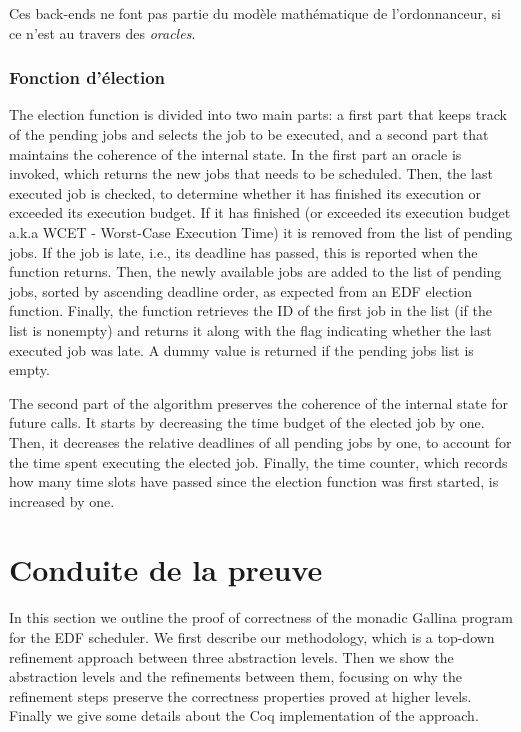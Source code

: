 			Ces back-ends ne font pas partie du modèle mathématique de l'ordonnanceur, si ce n'est au travers des \emph{oracles}.






			\subsubsection{Fonction d'élection}

			The election function is divided into two main parts: a first part that keeps track of the pending jobs and selects the job to be executed, and a second part that maintains the coherence of the internal state. In the first part an oracle is invoked, which returns the new jobs that needs to be scheduled. Then, the last executed job is checked, to determine whether it has finished its execution or exceeded its execution budget. If it has finished (or exceeded its execution budget a.k.a WCET - Worst-Case Execution Time) it is removed from the list of pending jobs. If the job is late, i.e., its deadline has passed, this is reported when the function returns. Then, the newly available jobs are added to the list of pending jobs, sorted by ascending deadline order, as expected from an EDF election function. Finally, the function retrieves the ID of the first job in the list (if the list is nonempty) and returns it along with the flag indicating whether the last executed job was late. A dummy value is returned if the pending jobs list is empty.

			The second part of the algorithm preserves the coherence of the internal state for future calls. It starts by decreasing the time budget of the elected job by one. Then, it decreases the relative deadlines of all pending jobs by one, to account for the time spent executing the elected job. Finally, the time counter, which records how many time slots have passed since the election function was first started, is increased by one.


	\section{Conduite de la preuve}

	\label{sec:proof}
	In this section we outline the proof of correctness of the monadic Gallina program for the EDF scheduler.
	We first describe our methodology, which is a top-down refinement approach between three abstraction levels. Then we show the abstraction levels and the refinements between them, focusing on why the refinement steps preserve the correctness properties proved at higher levels. Finally we give some details about the Coq implementation of the approach.


